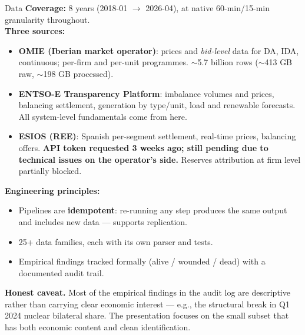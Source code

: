 \documentclass[10pt,aspectratio=169]{beamer}
\begin{document}
\begin{frame}{Data}
  \footnotesize
  \textbf{Coverage:} 8 years (2018-01 $\to$ 2026-04), at native 60-min/15-min granularity throughout.\\[4pt]
  \textbf{Three sources:}
  \begin{itemize}
    \item \textbf{OMIE (Iberian market operator)}: prices and \emph{bid-level} data for DA, IDA, continuous; per-firm and per-unit programmes. $\sim$5.7 billion rows ($\sim$413 GB raw, $\sim$198 GB processed).
    \item \textbf{ENTSO-E Transparency Platform}: imbalance volumes and prices, balancing settlement, generation by type/unit, load and renewable forecasts. All system-level fundamentals come from here.
    \item \textbf{ESIOS (REE)}: Spanish per-segment settlement, real-time prices, balancing offers. \textbf{API token requested 3 weeks ago; still pending due to technical issues on the operator's side.} Reserves attribution at firm level partially blocked.
  \end{itemize}
  \textbf{Engineering principles:}
  \begin{itemize}
    \item Pipelines are \textbf{idempotent}: re-running any step produces the same output and includes new data --- supports replication.
    \item 25+ data families, each with its own parser and tests.
    \item Empirical findings tracked formally (alive / wounded / dead) with a documented audit trail.
  \end{itemize}
  \textbf{Honest caveat.} Most of the empirical findings in the audit log are descriptive rather than carrying clear economic interest --- e.g., the structural break in Q1 2024 nuclear bilateral share. The presentation focuses on the small subset that has both economic content and clean identification.
\end{frame}
\end{document}
